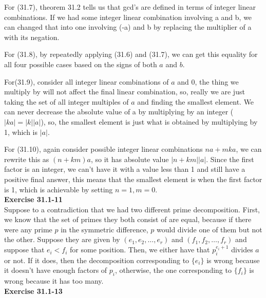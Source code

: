\documentclass{article}
\begin{document}
For (31.7), theorem 31.2 tells us that gcd's are defined in terms of integer linear combinations. If we had some integer linear combination involving a and b, we can changed that into one involving (-a) and b by replacing the multiplier of a with its negation.

For (31.8), by repeatedly applying (31.6) and (31.7), we can get this equality for all four possible cases based on the signs of both $a$ and $b$.

For(31.9), consider all integer linear combinations of $a$ and $0$, the thing we multiply  by will not affect the final linear combination, so, really we are just taking the set of all integer multiples of $a$ and finding the smallest element. We can never decrease the absolute value of a by multiplying by an integer ($|ka| = |k||a|$), so, the smallest element is just what is obtained by multiplying by 1, which is $|a|$.

For (31.10), again consider possible integer linear combinations $na + mka$, we can rewrite this as $(n+km)a$, so it has absolute value $|n+km||a|$. Since the first factor is an integer, we can't have it with a value less than 1 and still have a positive final answer, this means that the smallest element is when the first factor is 1, which is achievable by setting $n=1,m=0$.\\



\noindent\textbf{Exercise 31.1-11}\\

Suppose to a contradiction that we had two different prime decomposition. First, we know that the set of primes they both consist of are equal, because if there were any prime $p$ in the symmetric difference, $p$ would divide one of them but not the other. Suppose they are given by $(e_1,e_2, \ldots,e_r)$ and $(f_1,f_2,\ldots,f_r)$ and suppose that $e_i < f_i$ for some position. Then, we either have that $p_i^{e_i+1}$ divides $a$ or not. If it does, then the decomposition corresponding to $\{e_i\}$ is wrong because it doesn't have enough factors of $p_i$, otherwise, the one corresponding to $\{f_i\}$ is wrong because it has too many.\\



\noindent\textbf{Exercise 31.1-13}\\
\end{document}
